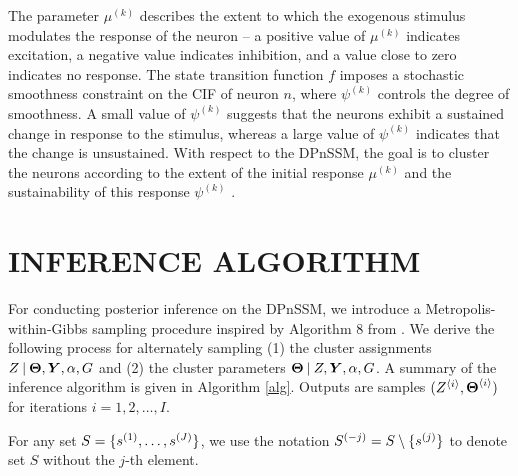 \documentclass[twoside]{article}
\begin{document}
The parameter $\mu^{(k)} $ describes the extent to which the exogenous stimulus modulates the response of the neuron -- a positive value of $\mu^{(k)}$ indicates excitation, a negative value indicates inhibition, and a value close to zero indicates no response. The state transition function $f$ imposes a stochastic smoothness constraint on the CIF of neuron $n$, where $\psi^{(k)}$ controls the degree of smoothness.  A small value of $\psi^{(k)}$ suggests that the neurons exhibit a sustained change in response to the stimulus, whereas a large value of $\psi^{(k)}$ indicates that the change is unsustained.  With respect to the DPnSSM, the goal is to cluster the neurons according to the extent of the initial response $\mu^{(k)}$ and the sustainability of this response $\psi^{(k)}$ . 

\section{INFERENCE ALGORITHM}
For conducting posterior inference on the DPnSSM, we introduce a Metropolis-within-Gibbs sampling procedure inspired by Algorithm 8 from \cite{neal2000markov}.  We derive the following process for alternately sampling (1) the cluster assignments $Z \:\vert\: \boldsymbol{\Theta}, \boldsymbol{Y}, \alpha, G$ and (2) the cluster parameters $\boldsymbol{\Theta} \:\vert\: Z, \boldsymbol{Y}, \alpha, G$.  A summary of the inference algorithm is given in Algorithm \ref{alg}. Outputs are samples $(Z^{\langle i\rangle}_{}, \boldsymbol{\Theta}^{\langle i\rangle}_{})$ for iterations $i = 1, 2, \ldots, I$.

For any set $S = \{{s}^{(1)}_{}, \ldots, {s}^{(J)}_{}\}$, we use the notation ${S}^{(-j)}_{} = S \setminus \{{s}^{(j)}_{}\}$ to denote set $S$ without the $j$-th element. 
\end{document}
